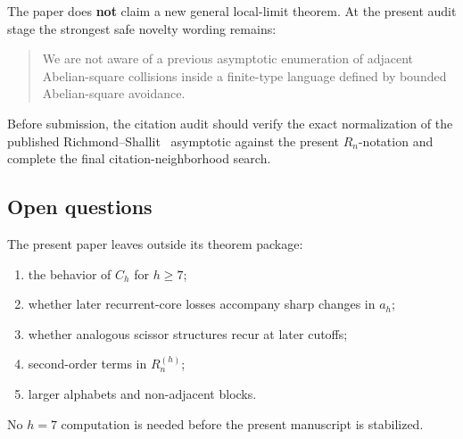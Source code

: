 \documentclass[12pt]{article}
\theoremstyle{definition}
\begin{document}
The paper does \textbf{not} claim a new general local-limit theorem. At the present audit stage the strongest safe novelty wording remains:

\begin{quote}
We are not aware of a previous asymptotic enumeration of adjacent Abelian-square collisions inside a finite-type language defined by bounded Abelian-square avoidance.
\end{quote}

Before submission, the citation audit should verify the exact normalization of the published Richmond--Shallit~\cite{Richmond2009} asymptotic against the present \(R_n\)-notation and complete the final citation-neighborhood search.

\subsection*{Open questions}

The present paper leaves outside its theorem package:
\begin{enumerate}
\item the behavior of \(C_h\) for \(h\ge7\);
\item whether later recurrent-core losses accompany sharp changes in \(a_h\);
\item whether analogous scissor structures recur at later cutoffs;
\item second-order terms in \(R_n^{(h)}\);
\item larger alphabets and non-adjacent blocks.
\end{enumerate}

No \(h=7\) computation is needed before the present manuscript is stabilized.




\appendix






\end{document}
